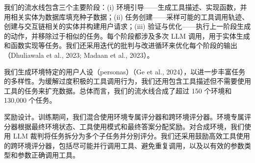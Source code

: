 我们的流水线包含三个主要阶段：(i) 环境引导——生成工具描述、实现函数，并用相关实体为数据库填充种子数据；(ii) 任务创建——采样可能的工具调用轨迹、创建与交互链相关的实体并构建用户请求；(iii) 验证与优化——执行上一阶段生成的动作，并移除过于相似的任务。每个阶段都涉及多次 LLM 调用，用于实体生成和函数实现等任务。我们还采用迭代的批判与改进循环来优化每个阶段的输出（Dhuliawala et al., 2023; Madaan et al., 2023）。

我们生成环境特定的用户人设（personas）（Ge et al., 2024），以进一步丰富任务的多样性。为缓解过度积极的工具调用行为，我们还用包含工具描述但不需要使用工具的任务来扩充数据。总体而言，我们的流水线合成了超过 150 个环境和 130,000 个任务。

奖励设计。训练期间，我们混合使用环境专属评分器和跨环境评分器。环境专属评分器根据最终环境状态、工具使用模式和最终答案分配奖励。对合成环境，我们使用 LLM 裁判将任务拆分为多个子任务并分别评分。我们还采用鼓励高效工具使用的跨环境评分器，包括尽可能并行调用工具、避免重复调用，以及以有效的参数类型和参数正确调用工具。
